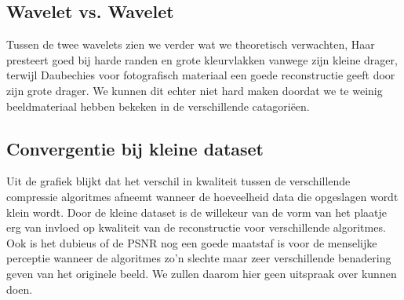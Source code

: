 \subsection{Wavelet vs. Wavelet}
Tussen de twee wavelets zien we verder wat we theoretisch verwachten, Haar presteert goed bij harde randen en grote kleurvlakken
vanwege zijn kleine drager, terwijl Daubechies voor fotografisch materiaal een goede reconstructie geeft door zijn grote drager.
We kunnen dit echter niet hard maken doordat we te weinig beeldmateriaal hebben bekeken in de verschillende catagori\"een. 

\subsection{Convergentie bij kleine dataset}
Uit de grafiek blijkt dat het verschil in kwaliteit tussen de verschillende compressie algoritmes afneemt wanneer
de hoeveelheid data die opgeslagen wordt klein wordt. 
Door de kleine dataset is de willekeur van de vorm van het plaatje erg van invloed op kwaliteit van de reconstructie 
voor verschillende algoritmes. 
Ook is het dubieus of de PSNR nog een goede maatstaf is voor de menselijke perceptie wanneer de algoritmes
zo'n slechte maar zeer verschillende benadering geven van het originele beeld.
We zullen daarom hier geen uitspraak over kunnen doen.

